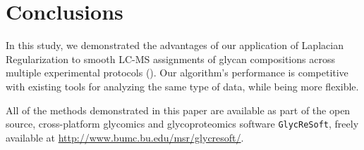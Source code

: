 \section{Conclusions}
    In this study, we demonstrated the advantages of our application of Laplacian
    Regularization to smooth LC-MS assignments of glycan compositions across multiple
    experimental protocols (\cite{Hu2012, Khatri2016a}). Our algorithm's performance is
    competitive with existing tools for analyzing the same type of data, while being more
    flexible.

    All of the methods demonstrated in this paper are available as part of the open source,
    cross-platform glycomics and glycoproteomics software \texttt{GlycReSoft}, freely
    available at \href{http://www.bumc.bu.edu/msr/glycresoft/}{http://www.bumc.bu.edu/msr/glycresoft/}.
